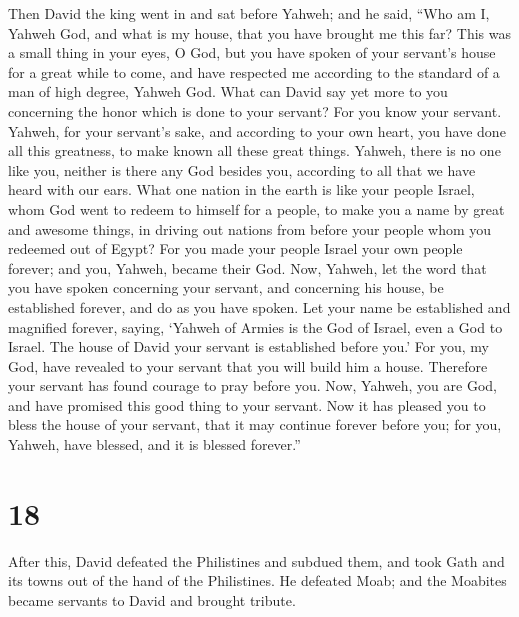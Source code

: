  Then David the king went in and sat before Yahweh; and he
said, ``Who am I, Yahweh God, and what is my house, that you have
brought me this far?  This was a small thing in your eyes,
O God, but you have spoken of your servant's house for a great while to
come, and have respected me according to the standard of a man of high
degree, Yahweh God.  What can David say yet more to you
concerning the honor which is done to your servant? For you know your
servant.  Yahweh, for your servant's sake, and according to
your own heart, you have done all this greatness, to make known all
these great things.  Yahweh, there is no one like you,
neither is there any God besides you, according to all that we have
heard with our ears.  What one nation in the earth is like
your people Israel, whom God went to redeem to himself for a people, to
make you a name by great and awesome things, in driving out nations from
before your people whom you redeemed out of Egypt?  For you
made your people Israel your own people forever; and you, Yahweh, became
their God.  Now, Yahweh, let the word that you have spoken
concerning your servant, and concerning his house, be established
forever, and do as you have spoken.  Let your name be
established and magnified forever, saying, `Yahweh of Armies is the God
of Israel, even a God to Israel. The house of David your servant is
established before you.'  For you, my God, have revealed to
your servant that you will build him a house. Therefore your servant has
found courage to pray before you.  Now, Yahweh, you are
God, and have promised this good thing to your servant. 
Now it has pleased you to bless the house of your servant, that it may
continue forever before you; for you, Yahweh, have blessed, and it is
blessed forever.''

\hypertarget{section-17}{%
\section{18}\label{section-17}}

 After this, David defeated the Philistines and subdued
them, and took Gath and its towns out of the hand of the Philistines.
 He defeated Moab; and the Moabites became servants to David
and brought tribute.

